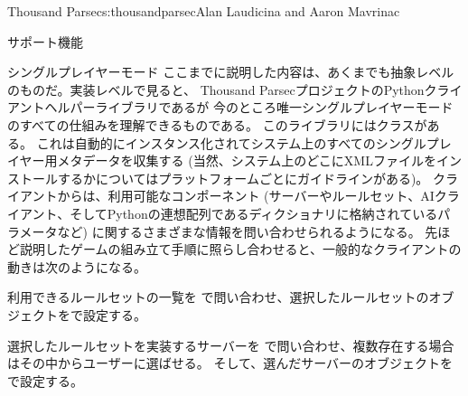 \begin{aosachapter}{Thousand Parsec}{s:thousandparsec}{Alan Laudicina and Aaron Mavrinac}
\begin{aosasect1}{サポート機能}
\begin{aosasect2}{シングルプレイヤーモード}
ここまでに説明した内容は、あくまでも抽象レベルのものだ。実装レベルで見ると、
Thousand ParsecプロジェクトのPythonクライアントヘルパーライブラリであるが
今のところ唯一シングルプレイヤーモードのすべての仕組みを理解できるものである。
このライブラリにはクラスがある。
これは自動的にインスタンス化されてシステム上のすべてのシングルプレイヤー用メタデータを収集する
(当然、システム上のどこにXMLファイルをインストールするかについてはプラットフォームごとにガイドラインがある)。
クライアントからは、利用可能なコンポーネント
(サーバーやルールセット、AIクライアント、そしてPythonの連想配列であるディクショナリに格納されているパラメータなど)
に関するさまざまな情報を問い合わせられるようになる。
先ほど説明したゲームの組み立て手順に照らし合わせると、一般的なクライアントの動きは次のようになる。

\begin{aosaenumerate}

  \item 利用できるルールセットの一覧を
  で問い合わせ、選択したルールセットのオブジェクトをで設定する。

  \item 選択したルールセットを実装するサーバーを
  で問い合わせ、複数存在する場合はその中からユーザーに選ばせる。
  そして、選んだサーバーのオブジェクトをで設定する。


\end{aosaenumerate}
\end{aosasect2}
\end{aosasect1}
\end{aosachapter}
